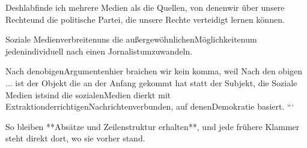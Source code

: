 \documentclass[a4paper]{article}
\begin{document}
        Deshlabfinde ich mehrere Medien als die Quellen, von denenwir über unsere Rechteund die politische Partei, die unsere Rechte verteidigt lernen können.

        Soziale Medienverbreitenuns die außergewöhnlichenMöglichkeitenum jedenindividuell nach einen Jornalistumzuwandeln.

        Nach denobigenArgumenten sind die sozialenMedien dierkt mit ExtraktionderrichtigenNachrichtenverbunden, auf denenDemokratie basiert.
        ```

        So bleiben **Absätze und Zeilenstruktur erhalten**, und jede frühere Klammer steht direkt dort, wo sie vorher stand.


        
        
\end{document}
